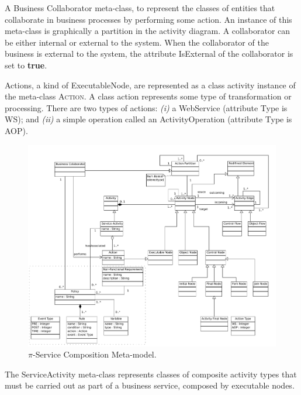 \documentclass{singlecol-new}
\theoremstyle{TH}{
\newtheorem{lemma}{Lemma}
\newtheorem{theorem}[lemma]{Theorem}
\newtheorem{corrolary}[lemma]{Corrolary}
\newtheorem{conjecture}[lemma]{Conjecture}
\newtheorem{proposition}[lemma]{Proposition}
\newtheorem{claim}[lemma]{Claim}
\newtheorem{stheorem}[lemma]{Wrong Theorem}
\newtheorem{algorithm}{Algorithm}
}
\theoremstyle{THrm}{
\newtheorem{definition}{Definition}[section]
\newtheorem{question}{Question}[section]
\newtheorem{remark}{Remark}
\newtheorem{scheme}{Scheme}
}
\theoremstyle{THhit}{
\newtheorem{case}{Case}[section]
}
\theoremstyle{THhsl}{
\newtheorem{example}{Example}
}
\begin{document}
\begin{compactitem}
\item A {\sc Business Collaborator} meta-class, to represent the classes of entities that collaborate in  business processes by performing some  action.
An instance of this meta-class is graphically a partition in the activity diagram.
A collaborator can be either internal or external to the system.
When the collaborator of the business is external to the system, the attribute {\sf IsExternal} of the collaborator is set to \textbf{true}.


\item {\sc Action}s, a kind of {\sc ExecutableNode}, are represented as a class activity instance of the meta-class \textsc{Action}.
A class action represents some type of transformation or processing.
There are two types of actions: \textit{(i)} a WebService (attribute Type is {\sf WS}); and \textit{(ii)} a simple operation called an {\sc ActivityOperation} (attribute Type is {\sc AOP}).

\begin{figure}[h]
\centering
\includegraphics[width=1\textwidth]{./figures/PiServiceComposition}
\caption{$\pi$-Service Composition Meta-model.}
\label{fig:e-scomposition-metamodel}
\end{figure}

\item The {\sc ServiceActivity} meta-class represents classes of composite activity types that must be carried out as part of a business service,  composed by  execu\-ta\-ble nodes.


\end{compactitem}
\end{document}
